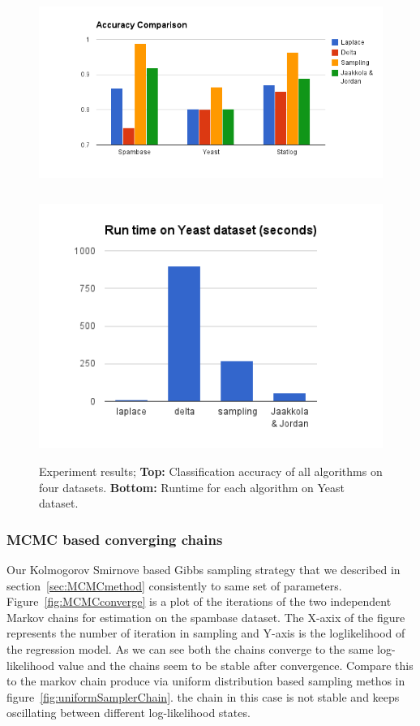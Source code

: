 \begin{figure}[t]
\centering
\includegraphics[height=7.0cm]{results/accuracy_comp.png}
\includegraphics[height=8.0cm]{results/speed_comp.png}

\caption{\small Experiment results; {\bf Top:} Classification accuracy of all algorithms on
four datasets. {\bf Bottom:} Runtime for each algorithm on Yeast dataset. }
\label{fig:results}
\end{figure}

\subsubsection{MCMC based converging chains}
Our Kolmogorov Smirnove based Gibbs sampling strategy that we described in
section~\ref{sec:MCMCmethod} consistently to same set of parameters.
Figure~\ref{fig:MCMCconverge} is a plot of the iterations of the two
independent Markov chains for estimation on the spambase dataset. 
The X-axix of the figure represents the number of
iteration in sampling and Y-axis is the loglikelihood of the regression model.
As we can see both the chains converge to the same log-likelihood value and the
chains seem to be stable after convergence. Compare this to the markov chain
produce via uniform distribution based sampling methos in
figure~\ref{fig:uniformSamplerChain}. the chain in this case is not stable and
keeps oscillating between different log-likelihood states. 
 

